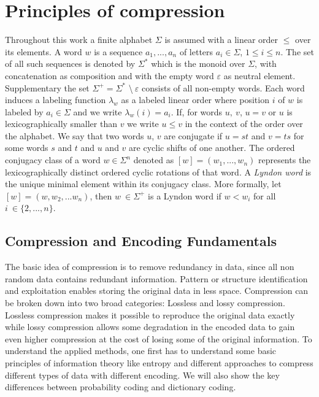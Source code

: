 
\chapter{Principles of compression}
\label{ch:Principles of compression}
\par{
Throughout this work a finite alphabet $\Sigma$ is assumed with a linear order $\leq$ over its elements. A word $w$ is a sequence $a_1,...,a_n$ of letters $a_i \in \Sigma$, $1 \leq i \leq n$. The set of all such sequences is denoted by $\Sigma^*$ which is the monoid over $\Sigma$, with concatenation as composition and with the empty word $\varepsilon$ as neutral element. Supplementary the set $\Sigma^+ = \Sigma^*$ \textbackslash $\: \varepsilon$ consists of all non-empty words. Each word induces a labeling function $\lambda_w$ as a labeled linear order where position $i$ of $w$ is labeled by $a_i \in \Sigma$ and we write $\lambda_w (i) = a_i$. If, for words $u, \: v$, $u = v$ or $u$ is lexicographically smaller than $v$ we write $u \leq v$ in the context of the order over the alphabet. We say that two words $u$, $v$ are conjugate if $u = st$ and $v = ts$ for some words $s$ and $t$ and $u$ and $v$ are cyclic shifts of one another. The ordered conjugacy class of a word $w \in \Sigma^n$ denoted as $[w] = (w_1,...,w_n)$ represents the lexicographically distinct ordered cyclic rotations of that word. A \emph{Lyndon word} is the unique minimal element within its conjugacy class. More formally, let $[w] = (w,w_2,...w_n)$, then $w \: \in \Sigma^+$ is a Lyndon word if $w<w_i$ for all $i \: \in \{2,...,n\}$.
}

\section{Compression and Encoding Fundamentals}
\label{ch:Principles of compression:sec:Compression}
\par{
	The basic idea of compression is to remove redundancy in data, since all non random data contains redundant information. Pattern or structure identification and exploitation enables storing the original data in less space. Compression can be broken down into two broad categories: Lossless and lossy compression. Lossless compression makes it possible to reproduce the original data exactly while lossy compression allows some degradation in the encoded data to gain even higher compression at the cost of losing some of the original information. To understand the applied methods, one first has to understand some basic principles of information theory like entropy and different approaches to compress different types of data with different encoding. We will also show the key differences between probability coding and dictionary coding.}

